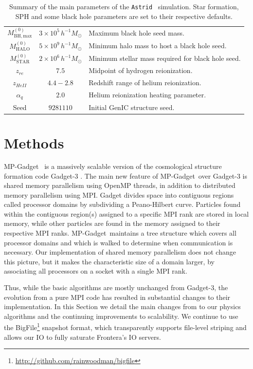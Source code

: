 \documentclass[fleqn,usenatbib]{mnras}
\newcommand{\msunh}{\,h^{-1}\unit{M_\odot}}
\newcommand{\software}[1]{{\small #1}}
\newcommand{\mpgadget}{\software{MP-Gadget}}
\def\astrid{\texttt{Astrid} }
\begin{document}
\begin{table}
\begin{tabular}{ccl}
    $M^{(0)}_\mathrm{BH,max}$ &    $3\times 10^{5}\msunh$ &  Maximum black hole seed mass.\\
    $M^{(0)}_\mathrm{HALO}$ &    $5\times10^{9}\msunh$ &    Minimum halo mass to host a black hole seed.\\
    $M^{(0)}_\mathrm{STAR}$ &    $2\times10^{6}\msunh$ &    Minimum stellar mass required for black hole seed.\\
    $z_{re}$ & $7.5$ & Midpoint of hydrogen reionization. \\
    $z_{HeII}$ & $4.4 - 2.8$ & Redshift range of helium reionization. \\
    $\alpha_q$ & $2.0$ & Helium reionization heating parameter. \\
    Seed & $9281110$ & Initial GenIC structure seed. \\
    \hline
  \end{tabular}
  \caption{Summary of the main parameters of the \astrid~simulation. Star formation, SPH and some black hole parameters are set to their respective defaults.}
  \label{tab:simparam}
\end{table}

\section{Methods}
\label{sec:methods}

\mpgadget~\citep{MPGadget2018} is a massively scalable version of the cosmological structure formation code Gadget-3 \citep{Springel:2005}. The main new feature of \mpgadget~over Gadget-3 is shared memory parallelism using OpenMP threads, in addition to distributed memory parallelism using MPI. Gadget divides space into contiguous regions called processor domains by subdividing a Peano-Hilbert curve. Particles found within the contiguous region(s) assigned to a specific MPI rank are stored in local memory, while other particles are found in the memory assigned to their respective MPI ranks. \mpgadget~maintains a tree structure which covers all processor domains and which is walked to determine when communication is necessary. Our implementation of shared memory parallelism does not change this picture, but it makes the characteristic size of a domain larger, by associating all processors on a socket with a single MPI rank.

Thus, while the basic algorithms are mostly unchanged from Gadget-3, the evolution from a pure MPI code has resulted in substantial changes to their implementation. In this Section we detail the main changes from \cite{Feng:2016} to our physics algorithms and the continuing improvements to scalability. %
We continue to use the \software{BigFile}\footnote{\url{http://github.com/rainwoodman/bigfile}} snapshot format, which transparently supports file-level striping and allows our IO to fully saturate Frontera's IO servers.
\end{document}
